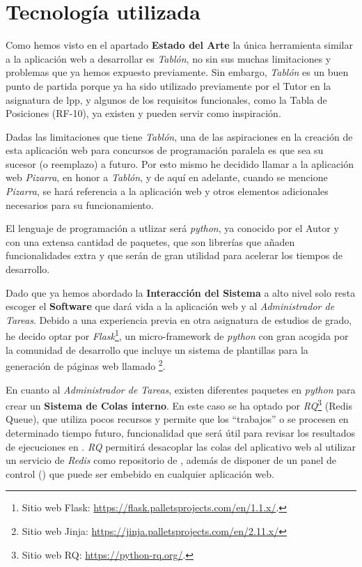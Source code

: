 \documentclass[11pt,spanish,listoffigures,listoftables]{tfgetsinf}
\begin{document}
\section{Tecnología utilizada}

Como hemos visto en el apartado \textbf{Estado del Arte} la única herramienta similar a la aplicación web a desarrollar es \textit{Tablón}, no sin sus muchas limitaciones y problemas que ya hemos expuesto previamente. Sin embargo, \textit{Tablón} es un buen punto de partida porque ya ha sido utilizado previamente por el Tutor en la asignatura de \acrshort{lpp}, y algunos de los requisitos funcionales, como la Tabla de Posiciones (RF-10), ya existen y pueden servir como inspiración.

Dadas las limitaciones que tiene \textit{Tablón}, una de las aspiraciones en la creación de esta aplicación web para concursos de programación paralela es que sea su sucesor (o reemplazo) a futuro. Por esto mismo he decidido llamar a la aplicación web \textit{Pizarra}, en honor a \textit{Tablón}, y de aquí en adelante, cuando se mencione \textit{Pizarra}, se hará referencia a la aplicación web y otros elementos adicionales necesarios para su funcionamiento. 

El lenguaje de programación a utlizar será \textit{python}, ya conocido por el Autor y con una extensa cantidad de \gls{paquete}s, que son librerías que añaden funcionalidades extra y que serán de gran utilidad para acelerar los tiempos de desarrollo. 

Dado que ya hemos abordado la \textbf{Interacción del Sistema} a alto nivel solo resta escoger el \textbf{Software} que dará vida a la aplicación web y al \textit{Administrador de Tareas}. Debido a una experiencia previa en otra asignatura de estudios de grado, he decido optar por \textit{Flask}\footnote{Sitio web Flask: \url{https://flask.palletsprojects.com/en/1.1.x/}.}, un micro-framework de \textit{python} con gran acogida por la comunidad de desarrollo que incluye un sistema de plantillas para la generación de páginas web llamado \footnote{Sitio web Jinja: \url{https://jinja.palletsprojects.com/en/2.11.x/}}. 

En cuanto al \textit{Administrador de Tareas}, existen diferentes \gls{paquete}s en \textit{python} para crear un \textbf{Sistema de Colas interno}. En este caso se ha optado por \textit{RQ}\footnote{Sitio web RQ: \url{https://python-rq.org/}.} (Redis Queue), que utiliza pocos recursos y permite que los ``trabajos'' o  se procesen en determinado tiempo futuro, funcionalidad que será útil para revisar los resultados de ejecuciones en \kahan. \textit{RQ} permitirá desacoplar las \gls{cola}s del aplicativo web al utilizar un servicio de \textit{Redis} como repositorio de , además de disponer de un panel de control () que puede ser embebido en cualquier aplicación web.
\end{document}
